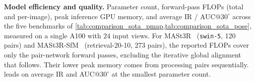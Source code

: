 

\begin{table}[t]
    \caption{
        \textbf{Model efficiency and quality.}
        Parameter count, forward-pass FLOPs (total and per-image), peak inference GPU memory, and average IR / AUC@$30^{\circ}$ across the five benchmarks of \cref{tab:comparison_sota_pmap,tab:comparison_sota_pose}, measured on a single A100 with $24$ input views.
        For MASt3R~\citep{leroy2025grounding} (\texttt{swin-5}, 120 pairs) and MASt3R-SfM~\citep{duisterhof2024mast3rsfm} (retrieval-20-10, 273 pairs), the reported FLOPs cover only the pair-network forward passes, excluding the iterative global alignment that follows. Their lower peak memory comes from processing pairs sequentially.
        \methodname{} leads on average IR and AUC@$30^{\circ}$ at the smallest parameter count.
    }
    \label{tab:comparison_efficiency}
    \footnotesize
    \setlength{\tabcolsep}{5pt}


\end{table}
